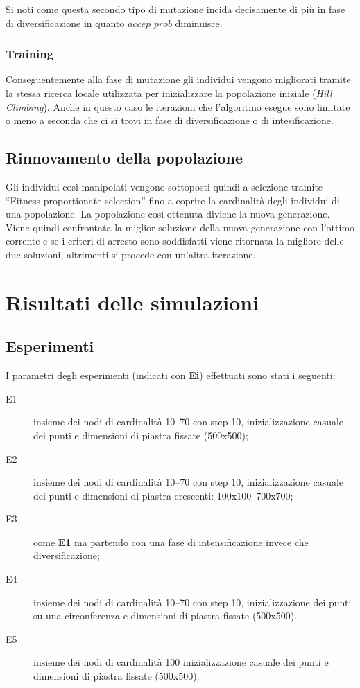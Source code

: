 \documentclass[12pt,a4paper]{article}
\begin{document}
                Si noti come questa secondo tipo di mutazione incida decisamente di pi\`u in fase di diversificazione in quanto $accep\_prob$ diminuisce.

            \subsubsection{Training}
                Conseguentemente alla fase di mutazione gli individui vengono migliorati tramite la stessa ricerca locale utilizzata per inizializzare
                la popolazione iniziale (\emph{Hill Climbing}).
                Anche in questo caso le iterazioni che l'algoritmo esegue sono limitate o meno a seconda che ci si trovi in fase di diversificazione o di intesificazione.

        \subsection{Rinnovamento della popolazione}
            Gli individui cos\`i manipolati vengono sottoposti quindi a selezione tramite ``Fitness proportionate selection'' fino a coprire la
            cardinalit\`a degli individui di una popolazione.
            La popolazione cos\`i ottenuta diviene la nuova generazione.
            Viene quindi confrontata la miglior soluzione della nuova generazione con l'ottimo corrente e se i criteri di arresto sono soddisfatti viene ritornata la migliore delle due soluzioni,
            altrimenti si procede con un'altra iterazione.

    \section{Risultati delle simulazioni}
        
        \subsection{Esperimenti}
        I parametri degli esperimenti (indicati con \textbf{Ei}) effettuati sono stati i seguenti:
        \begin{description}
            \item[E1] insieme dei nodi di cardinalit\`a 10--70 con step 10, inizializzazione casuale dei punti e dimensioni di piastra fissate (500x500);
            \item[E2] insieme dei nodi di cardinalit\`a 10--70 con step 10, inizializzazione casuale dei punti e dimensioni di piastra crescenti: 100x100--700x700;
            \item[E3] come \textbf{E1} ma partendo con una fase di intensificazione invece che diversificazione;
            \item[E4] insieme dei nodi di cardinalit\`a 10--70 con step 10, inizializzazione dei punti su una circonferenza e dimensioni di piastra fissate (500x500).
            \item[E5] insieme dei nodi di cardinalit\`a 100 inizializzazione casuale dei punti e dimensioni di piastra fissate (500x500).
        \end{description}
\end{document}
